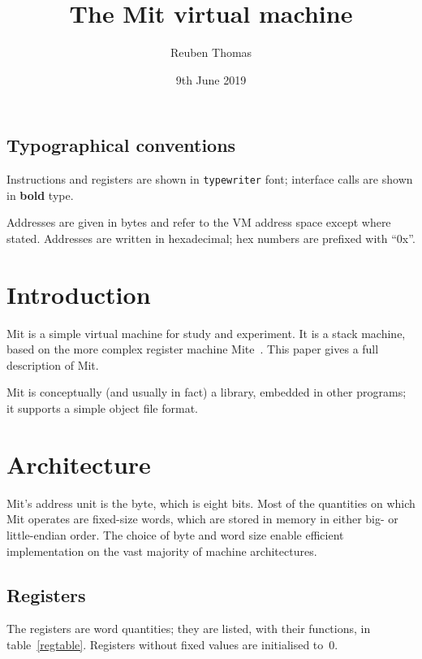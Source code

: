 \documentclass[a4paper]{article}
\title{The Mit virtual machine}
\author{Reuben Thomas}
\date{9th June 2019}
\begin{document}
\maketitle

\subsection*{Typographical conventions}

Instructions and registers are shown in {\tt typewriter} font;
interface calls are shown in {\bf bold} type.

Addresses are given in bytes and refer to the VM address space except where
stated. Addresses are written in hexadecimal; hex numbers are prefixed with
“0x”.


\section{Introduction}

Mit is a simple virtual machine for study and experiment. It is a stack machine, based on the more complex register machine Mite~\cite{mite0}.
This paper gives a full description of Mit.

Mit is conceptually (and usually in fact) a library, embedded in other programs; it supports a simple object file format.


\section{Architecture}

Mit's address unit is the byte, which is eight bits.
Most of the quantities on which Mit operates are fixed-size words, which are stored in memory in either big- or little-endian order.
The choice of byte and word size enable efficient implementation on the vast majority of machine architectures.


\subsection{Registers}
\label{registers}

The registers are word quantities; they are listed, with their functions, in table~\ref{regtable}. Registers without fixed values are initialised to~$0$.
\end{document}
